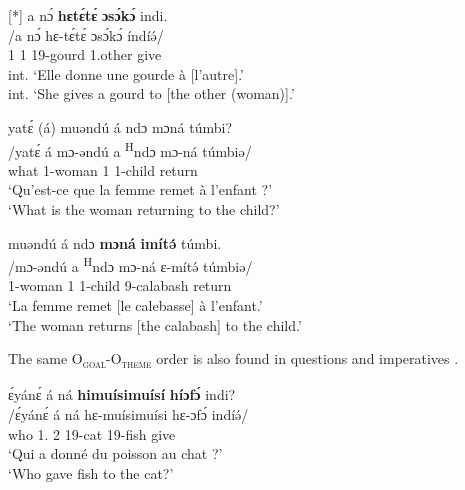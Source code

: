 \documentclass[output=paper,colorlinks,citecolor=brown
]{langscibook}
\begin{document}
\ex
[*]{
\label{ditransbad}
\glll
{\db}a nɔ́ \textbf{hɛtɛ́tɛ́} \textbf{ɔsɔ́kɔ́} indi.  \\
/a nɔ́ hɛ-tɛ́tɛ́ ɔsɔ́kɔ́ índíə́/ \\
{\db}1\SM{} \PST{}1{} 19-gourd 1.other give \\
\glt
int. `Elle donne une gourde à [l'autre]\textsubscript{\FOC{}}.' \\ int. `She gives a gourd to [the other (woman)]\textsubscript{\FOC{}}.' \jambox*{[PM 1542] }
}

\z
\z

\ea
\begin{xlist}
\label{ditransgourdq}
\glll
{\db}yatɛ́ (á) muəndú á ndɔ mɔná túmbi? \\
/yatɛ́ á mɔ-əndú a \textsuperscript{H}ndɔ mɔ-ná túmbiə/ \\
{\db}what \COP{} 1-woman 1\SM{} \PRS{} 1-child return \\
\glt
`Qu'est-ce que la femme remet à l'enfant ?' \\ `What is the woman returning to the child?' \jambox*{[JO 1588] }
\end{xlist}


\begin{xlist}
\label{ditransgourdtheme}
\glll
{\db}muəndú á ndɔ \textbf{mɔná} \textbf{imítə́} túmbi. \\
/mɔ-əndú a \textsuperscript{H}ndɔ mɔ-ná ɛ-mítə́ túmbiə/ \\
{\db}1-woman 1\SM{} \PRS{} 1-child 9-calabash return \\
\glt
`La femme remet [le calebasse]\textsubscript{\FOC{}} à l'enfant.' \\ `The woman returns [the calabash]\textsubscript{\FOC{}} to the child.' \jambox*{[JO 1587] }
\end{xlist}
\z

The same O\textsubscript{\textsc{goal}}-O\textsubscript{\textsc{theme}} order is also found in questions  and imperatives .

\ea
\label{whofoodcatq}
\glll
{\db}ɛ́yánɛ́ á ná \textbf{himuísimuísí} \textbf{híɔfɔ́} indi? \\
/ɛ́yánɛ́ á ná hɛ-muísimuísi hɛ-ɔfɔ́ indíə́/\\
{\db}who 1\SM{}.\REL{} \PST{}2{} 19-cat 19-fish give \\
\glt
`Qui a donné du poisson au chat ?' \\ `Who gave fish to the cat?' \jambox*{[EO 278] }
\end{document}
